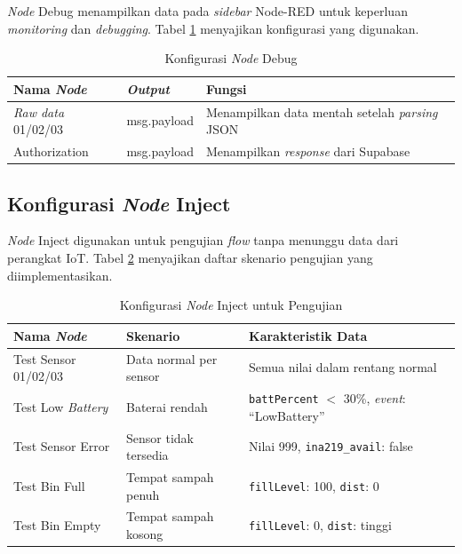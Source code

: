 \textit{Node} Debug menampilkan data pada \textit{sidebar} Node-RED untuk keperluan \textit{monitoring} dan \textit{debugging}. Tabel \ref{tab:impl-konfigurasi-debug} menyajikan konfigurasi yang digunakan.

\begin{table}[H]
  \caption{Konfigurasi \textit{Node} Debug}
  \label{tab:impl-konfigurasi-debug}
  \begin{tabularx}{\textwidth}{| l | l | X |}
    \hline
    \textbf{Nama \textit{Node}} & \textbf{\textit{Output}} & \textbf{Fungsi} \\
    \hline
    \textit{Raw data} 01/02/03 & msg.payload & Menampilkan data mentah setelah \textit{parsing} JSON \\
    \hline
    Authorization & msg.payload & Menampilkan \textit{response} dari Supabase \\
    \hline
  \end{tabularx}
\end{table}

\subsection{Konfigurasi \textit{Node} Inject}

\textit{Node} Inject digunakan untuk pengujian \textit{flow} tanpa menunggu data dari perangkat IoT. Tabel \ref{tab:impl-konfigurasi-inject} menyajikan daftar skenario pengujian yang diimplementasikan.

\begin{table}[H]
  \caption{Konfigurasi \textit{Node} Inject untuk Pengujian}
  \label{tab:impl-konfigurasi-inject}
  \begin{tabularx}{\textwidth}{| l | X | X |}
    \hline
    \textbf{Nama \textit{Node}} & \textbf{Skenario} & \textbf{Karakteristik Data} \\
    \hline
    Test Sensor 01/02/03 & Data normal per sensor & Semua nilai dalam rentang normal \\
    \hline
    Test Low \textit{Battery} & Baterai rendah & \texttt{battPercent} $<$ 30\%, \textit{event}: ``LowBattery'' \\
    \hline
    Test Sensor Error & Sensor tidak tersedia & Nilai 999, \texttt{ina219\_avail}: false \\
    \hline
    Test Bin Full & Tempat sampah penuh & \texttt{fillLevel}: 100, \texttt{dist}: 0 \\
    \hline
    Test Bin Empty & Tempat sampah kosong & \texttt{fillLevel}: 0, \texttt{dist}: tinggi \\
    \hline
  \end{tabularx}
\end{table}


